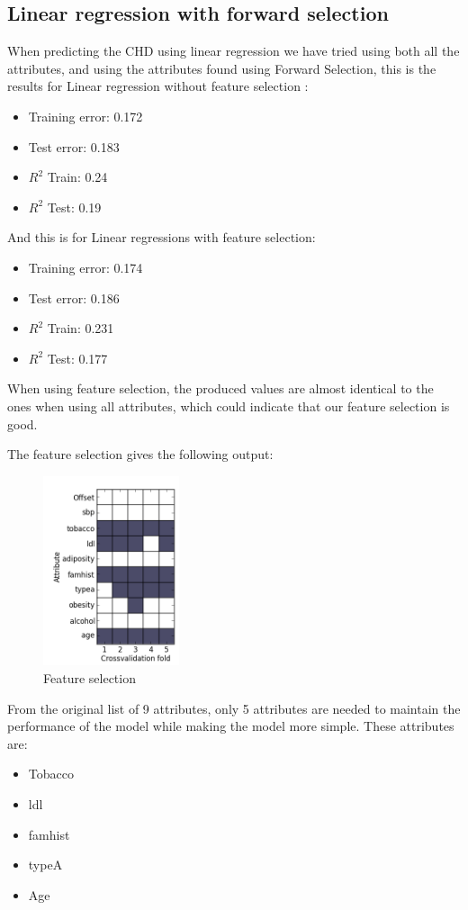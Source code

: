 \subsection{Linear regression with forward selection}
When predicting the CHD using linear regression we have tried using both all the attributes, and using the attributes found using Forward Selection, this is the results for Linear regression without feature selection :
\begin{itemize}
\item Training error: 0.172
\item Test error: 0.183
\item $R^{2}$ Train: 0.24
\item $R^{2}$ Test: 0.19
\end{itemize}
And this is for Linear regressions with feature selection:
\begin{itemize}
\item Training error: 0.174
\item Test error: 0.186
\item $R^{2}$ Train: 0.231
\item $R^{2}$ Test: 0.177
\end{itemize}
When using feature selection, the produced values are almost identical to the ones when using all attributes, which could indicate that our feature selection is good.

The feature selection gives the following output:
\begin{figure}[H]
\centering
\includegraphics[width=4cm, keepaspectratio=true]{pictures/cv_fold.png}
\caption{Feature selection}
\label{featureSelection}
\end{figure}
From the original list of 9 attributes, only 5 attributes are needed to maintain the performance of the model while making the model more simple. These attributes are:
\begin{itemize}
\item Tobacco
\item ldl
\item famhist
\item typeA
\item Age
\end{itemize}



